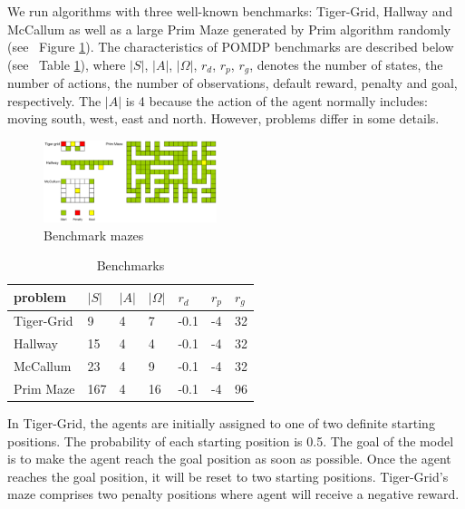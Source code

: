 \documentclass{article}
\begin{document}
We run algorithms with three well-known benchmarks: Tiger-Grid, Hallway and McCallum 
as well as a large Prim Maze generated by Prim algorithm randomly
(see ~Figure \ref{fig:mazes}). The characteristics of POMDP benchmarks are described
below (see ~Table \ref{table:benchmarks}), where $|S|$, $|A|$, $|\Omega|$, $r_d$, $r_p$, $r_g$, 
denotes the number of states, the number of actions, the number of observations, default
reward, penalty and goal, respectively. The $|A|$ is 4 because the action of the agent
normally includes: moving south, west, east and north. However, problems differ in some
details.

\begin{figure}[h]
  \centering
    \includegraphics[width=0.45\textwidth]{mazes.png}
  \caption{Benchmark mazes}
  \label{fig:mazes}
\end{figure}

\begin{table}[h]
  \caption{Benchmarks}
  \label{table:benchmarks}
  \centering
  \begin{tabular}{lllllll}
    \toprule
    problem         & $|S|$          & $|A|$          & $|\Omega|$  &$r_d$  &$r_p$  &$r_g$\\
    \midrule
    Tiger-Grid      & 9              & 4              & 7           & -0.1  & -4    & 32  \\
    Hallway         & 15             & 4              & 4           & -0.1  & -4    & 32  \\
    McCallum        & 23             & 4              & 9           & -0.1  & -4    & 32  \\
    Prim Maze       & 167            & 4              & 16          & -0.1  & -4    & 96  \\
    \bottomrule
  \end{tabular}
\end{table}

In Tiger-Grid, the agents are initially assigned to one of two definite starting positions.
The probability of each starting position is 0.5. The goal of the model is to make the agent
reach the goal position as soon as possible. Once the agent reaches the goal position,
it will be reset to two starting positions. Tiger-Grid's maze comprises two penalty positions
where agent will receive a negative reward. 
\end{document}

